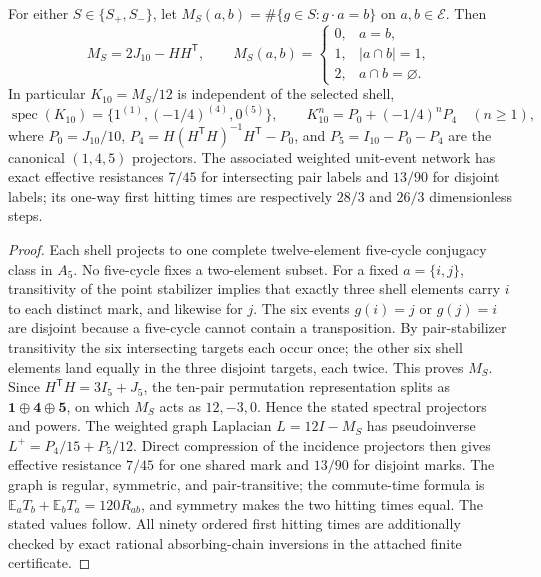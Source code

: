 \documentclass[11pt]{article}
\begin{document}
\begin{theorem}
\label{p1b:thm:two-shell-ten-pair-kernel}
For either $S\in\{S_+,S_-\}$, let
$M_S(a,b)=\#\{g\in S:g\cdot a=b\}$ on $a,b\in\mathscr E$.
Then
\[
 \boxed{M_S=2J_{10}-HH^{\mathsf T}},\qquad
 M_S(a,b)=\begin{cases}
 0,&a=b,\\1,&|a\cap b|=1,\\2,&a\cap b=\varnothing.
 \end{cases}
\]
In particular $K_{10}=M_S/12$ is independent of the selected shell,
\[
 \boxed{\operatorname{spec}(K_{10})=
 \{1^{(1)},(-1/4)^{(4)},0^{(5)}\}},\qquad
 K_{10}^n=P_0+(-1/4)^nP_4\quad(n\ge1),
\]
where $P_0=J_{10}/10$, $P_4=H(H^{\mathsf T}H)^{-1}H^{\mathsf T}-P_0$,
and $P_5=I_{10}-P_0-P_4$ are the canonical $(1,4,5)$ projectors.
The associated weighted unit-event network has exact effective resistances
$7/45$ for intersecting pair labels and $13/90$ for disjoint labels;
its one-way first hitting times are respectively $28/3$ and $26/3$
dimensionless steps.
\end{theorem}
\begin{proof}
Each shell projects to one complete twelve-element five-cycle conjugacy
class in $A_5$.  No five-cycle fixes a two-element subset.  For a fixed
$a=\{i,j\}$, transitivity of the point stabilizer implies that exactly
three shell elements carry $i$ to each distinct mark, and likewise for
$j$.  The six events $g(i)=j$ or $g(j)=i$ are disjoint because a five-cycle
cannot contain a transposition.  By pair-stabilizer transitivity the six
intersecting targets each occur once; the other six shell elements land
equally in the three disjoint targets, each twice.  This proves $M_S$.
Since $H^{\mathsf T}H=3I_5+J_5$, the ten-pair permutation representation
splits as $\mathbf1\oplus\mathbf4\oplus\mathbf5$, on which
$M_S$ acts as $12,-3,0$.  Hence the stated spectral projectors and
powers.  The weighted graph Laplacian $L=12I-M_S$ has pseudoinverse
$L^+=P_4/15+P_5/12$.  Direct compression of the incidence projectors
then gives effective resistance $7/45$ for one shared mark and $13/90$
for disjoint marks.  The graph is regular, symmetric, and pair-transitive;
the commute-time formula is $\mathbb E_aT_b+\mathbb E_bT_a=120R_{ab}$,
and symmetry makes the two hitting times equal.  The stated values follow.
All ninety ordered first hitting times are additionally checked by exact
rational absorbing-chain inversions in the attached finite certificate.
\end{proof}
\end{document}
